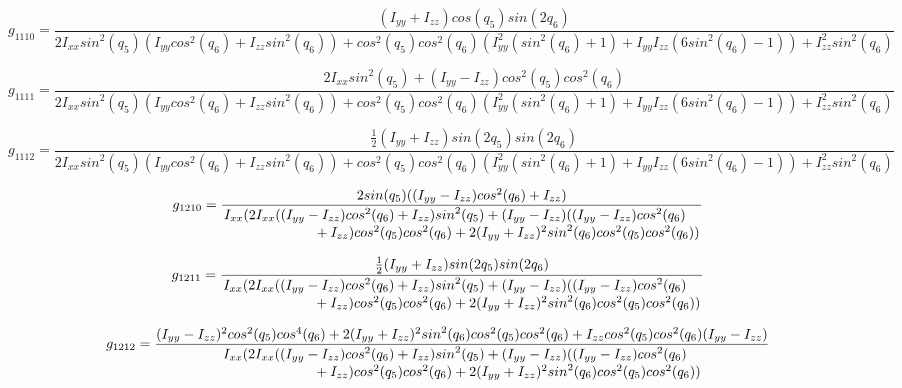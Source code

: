 \documentclass[12pt, letterpaper]{article}
\begin{document}
\[
g_{1110} = \frac{(I_{yy}+I_{zz})cos(q_{5})sin(2q_{6})}
{2I_{xx}{sin}^2(q_{5})(I_{yy}{cos}^2(q_{6})+I_{zz}{sin}^2(q_{6}))+{cos}^2(q_{5}){cos}^2(q_{6})(I_{yy}^2({sin}^2(q_{6})+1)+I_{yy}I_{zz}(6 {sin}^2(q_{6})-1))+I_{zz}^2{sin}^2(q_{6})}
\]

\[
g_{1111} = \frac{2I_{xx}{sin}^2(q_{5})+(I_{yy}-I_{zz}){cos}^2(q_{5}){cos}^2(q_{6})}
{2I_{xx}{sin}^2(q_{5})(I_{yy}{cos}^2(q_{6})+I_{zz}{sin}^2(q_{6}))+{cos}^2(q_{5}){cos}^2(q_{6})(I_{yy}^2({sin}^2(q_{6})+1)+I_{yy}I_{zz}(6 {sin}^2(q_{6})-1))+I_{zz}^2{sin}^2(q_{6})}
\]

\[
g_{1112} = \frac{\frac{1}{2}(I_{yy}+I_{zz}){sin}(2q_{5}){sin}(2q_{6})}
{2I_{xx}{sin}^2(q_{5})(I_{yy}{cos}^2(q_{6})+I_{zz}{sin}^2(q_{6}))+{cos}^2(q_{5}){cos}^2(q_{6})(I_{yy}^2({sin}^2(q_{6})+1)+I_{yy}I_{zz}(6 {sin}^2(q_{6})-1))+I_{zz}^2{sin}^2(q_{6})}
\]

\[
g_{1210} = \frac{2{sin}(q_{5})((I_{yy}-I_{zz}){cos}^2(q_{6})+I_{zz})}
{\splitfrac{I_{xx}( 2 I_{xx} ((I_{yy}-I_{zz}) {cos}^{2}(q_{6}) + I_{zz}) {sin}^{2}(q_{5}) + 
(I_{yy} - I_{zz}) ((I_{yy}-I_{zz}) {cos}^{2}(q_{6})}
{ + I_{zz}) {cos}^{2}(q_{5}) {cos}^{2}(q_{6}) + 2 (I_{yy} + I_{zz})^{2} {sin}^{2}(q_{6}) {cos}^{2}(q_{5}) {cos}^{2}(q_{6}))}}
\]

\[
g_{1211} = \frac{\frac{1}{2}(I_{yy}+I_{zz}){sin}(2q_{5}){sin}(2q_{6})}
{\splitfrac{I_{xx}( 2 I_{xx} ((I_{yy}-I_{zz}) {cos}^{2}(q_{6}) + I_{zz}) {sin}^{2}(q_{5}) + 
(I_{yy} - I_{zz}) ((I_{yy}-I_{zz}) {cos}^{2}(q_{6})}
{ + I_{zz}) {cos}^{2}(q_{5}) {cos}^{2}(q_{6}) + 2 (I_{yy} + I_{zz})^{2} {sin}^{2}(q_{6}) {cos}^{2}(q_{5}) {cos}^{2}(q_{6}))}}
\]

\[
g_{1212} = \frac{(I_{yy}-I_{zz})^2{cos}^2(q_{5}){cos}^4(q_{6}) + 2(I_{yy}+I_{zz})^2{sin}^2(q_{6}){cos}^2(q_{5}){cos}^2(q_{6})+I_{zz}{cos}^2(q_{5}){cos}^2(q_{6})(I_{yy}-I_{zz})}
{\splitfrac{I_{xx}( 2 I_{xx} ((I_{yy}-I_{zz}) {cos}^{2}(q_{6}) + I_{zz}) {sin}^{2}(q_{5}) + 
(I_{yy} - I_{zz}) ((I_{yy}-I_{zz}) {cos}^{2}(q_{6})}
{ + I_{zz}) {cos}^{2}(q_{5}) {cos}^{2}(q_{6}) + 2 (I_{yy} + I_{zz})^{2} {sin}^{2}(q_{6}) {cos}^{2}(q_{5}) {cos}^{2}(q_{6}))}}
\]
\end{document}

